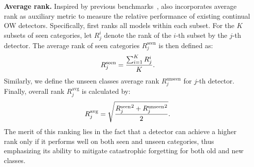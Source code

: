 \noindent\textbf{Average rank. }Inspired by previous benchmarks~\cite{zhai2019large,li2021grounded}, {\dataset} also incorporates average rank as auxiliary metric to measure the relative performance of existing continual OW detectors. 
%
%
Specifically, {\dataset} first ranks all models within each subset. For the $K$ subsets of seen categories, let $R^i_j$ denote the rank of the $i$-th subset by the $j$-th detector. The average rank of seen categories $R^{\text{seen}}_j$ is then defined as:
\vspace{-0.5em}
\begin{equation}
\vspace{-0.5em}
    R^{\text{seen}}_{j} = \frac{\sum_{i=1}^{K}R^{i}_{j}}{K}.
\end{equation}
Similarly, we define the unseen classes average rank $R^{\text{unseen}}_{j}$ for $j$-th detector.
%
Finally, overall rank $R^{\text{avg}}_{j}$ is calculated by:
\vspace{-0.5em}
\begin{equation}
\vspace{-0.5em}
    R^{\text{avg}}_{j} = \sqrt{ \frac{{R^{\text{seen}}_{j}}^{2}+{R^{\text{unseen}}_{j}}^{2}}{2}}.
\end{equation}
The merit of this ranking lies in the fact that a detector can achieve a higher rank only if it performs well on both seen and unseen categories, thus emphasizing its ability to mitigate catastrophic forgetting for both old and new classes.




